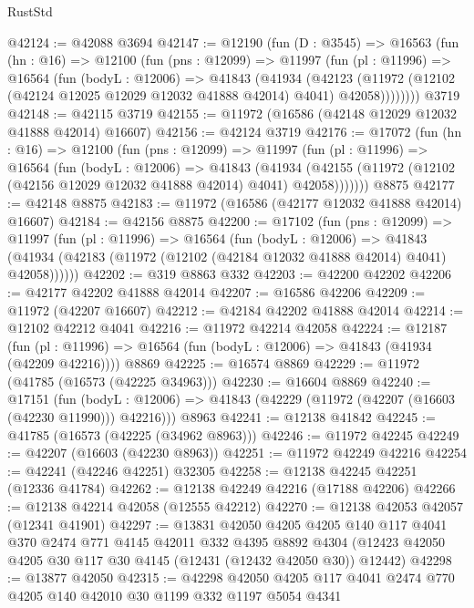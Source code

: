 \begin{lexlean}{RustStd}
\begin{coremodule}
@42124 := @42088 @3694
@42147 := @12190
    (fun (D : @3545) =>
    @16563
      (fun (hn : @16) =>
      @12100
        (fun (pns : @12099) =>
        @11997
          (fun (pl : @11996) =>
          @16564
            (fun (bodyL : @12006) =>
            @41843
              (@41934
                (@42123
                  (@11972 (@12102 (@42124 @12025 @12029 @12032 @41888 @42014) @4041) @42058))))))))
    @3719
@42148 := @42115 @3719
@42155 := @11972 (@16586 (@42148 @12029 @12032 @41888 @42014) @16607)
@42156 := @42124 @3719
@42176 := @17072
    (fun (hn : @16) =>
    @12100
      (fun (pns : @12099) =>
      @11997
        (fun (pl : @11996) =>
        @16564
          (fun (bodyL : @12006) =>
          @41843
            (@41934
              (@42155 (@11972 (@12102 (@42156 @12029 @12032 @41888 @42014) @4041) @42058)))))))
    @8875
@42177 := @42148 @8875
@42183 := @11972 (@16586 (@42177 @12032 @41888 @42014) @16607)
@42184 := @42156 @8875
@42200 := @17102
    (fun (pns : @12099) =>
    @11997
      (fun (pl : @11996) =>
      @16564
        (fun (bodyL : @12006) =>
        @41843 (@41934 (@42183 (@11972 (@12102 (@42184 @12032 @41888 @42014) @4041) @42058))))))
@42202 := @319 @8863 @332
@42203 := @42200 @42202
@42206 := @42177 @42202 @41888 @42014
@42207 := @16586 @42206
@42209 := @11972 (@42207 @16607)
@42212 := @42184 @42202 @41888 @42014
@42214 := @12102 @42212 @4041
@42216 := @11972 @42214 @42058
@42224 := @12187
    (fun (pl : @11996) => @16564 (fun (bodyL : @12006) => @41843 (@41934 (@42209 @42216))))
    @8869
@42225 := @16574 @8869
@42229 := @11972 (@41785 (@16573 (@42225 @34963)))
@42230 := @16604 @8869
@42240 := @17151
    (fun (bodyL : @12006) => @41843 (@42229 (@11972 (@42207 (@16603 (@42230 @11990))) @42216)))
    @8963
@42241 := @12138 @41842
@42245 := @41785 (@16573 (@42225 (@34962 @8963)))
@42246 := @11972 @42245
@42249 := @42207 (@16603 (@42230 @8963))
@42251 := @11972 @42249 @42216
@42254 := @42241 (@42246 @42251) @32305
@42258 := @12138 @42245 @42251 (@12336 @41784)
@42262 := @12138 @42249 @42216 (@17188 @42206)
@42266 := @12138 @42214 @42058 (@12555 @42212)
@42270 := @12138 @42053 @42057 (@12341 @41901)
@42297 := @13831
    @42050
    @4205
    @4205
    @140
    @117
    @4041
    @370
    @2474
    @771
    @4145
    @42011
    @332
    @4395
    @8892
    @4304
    (@12423 @42050 @4205 @30 @117 @30 @4145 (@12431 (@12432 @42050 @30)) @12442)
@42298 := @13877 @42050
@42315 := @42298
    @42050
    @4205
    @117
    @4041
    @2474
    @770
    @4205
    @140
    @42010
    @30
    @1199
    @332
    @1197
    @5054
    @4341

\end{coremodule}
\end{lexlean}

